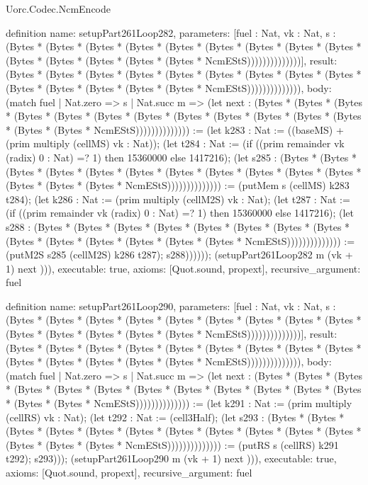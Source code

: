 \begin{lexlean}{Uorc.Codec.NcmEncode}
\begin{semanticmodule}
definition{
  name: setupPart261Loop282,
  parameters: [fuel : Nat, vk : Nat, s : (Bytes * (Bytes * (Bytes * (Bytes * (Bytes * (Bytes * (Bytes * (Bytes * (Bytes * (Bytes * (Bytes * (Bytes * (Bytes * (Bytes * NcmEStS))))))))))))))],
  result: (Bytes * (Bytes * (Bytes * (Bytes * (Bytes * (Bytes * (Bytes * (Bytes * (Bytes * (Bytes * (Bytes * (Bytes * (Bytes * (Bytes * NcmEStS)))))))))))))),
  body: (match fuel
    | Nat.zero => s
    | Nat.succ m => (let next : (Bytes * (Bytes * (Bytes * (Bytes * (Bytes * (Bytes * (Bytes * (Bytes * (Bytes * (Bytes * (Bytes * (Bytes * (Bytes * (Bytes * NcmEStS)))))))))))))) := (let k283 : Nat := ((baseMS) + (prim multiply (cellMS) vk : Nat)); (let t284 : Nat := (if ((prim remainder vk (radix) 0 : Nat) =? 1) then 15360000 else 1417216); (let s285 : (Bytes * (Bytes * (Bytes * (Bytes * (Bytes * (Bytes * (Bytes * (Bytes * (Bytes * (Bytes * (Bytes * (Bytes * (Bytes * (Bytes * NcmEStS)))))))))))))) := (putMem s (cellMS) k283 t284); (let k286 : Nat := (prim multiply (cellM2S) vk : Nat); (let t287 : Nat := (if ((prim remainder vk (radix) 0 : Nat) =? 1) then 15360000 else 1417216); (let s288 : (Bytes * (Bytes * (Bytes * (Bytes * (Bytes * (Bytes * (Bytes * (Bytes * (Bytes * (Bytes * (Bytes * (Bytes * (Bytes * (Bytes * NcmEStS)))))))))))))) := (putM2S s285 (cellM2S) k286 t287); s288)))))); (setupPart261Loop282 m (vk + 1) next ))),
  executable: true,
  axioms: [Quot.sound, propext],
  recursive_argument: fuel
}

definition{
  name: setupPart261Loop290,
  parameters: [fuel : Nat, vk : Nat, s : (Bytes * (Bytes * (Bytes * (Bytes * (Bytes * (Bytes * (Bytes * (Bytes * (Bytes * (Bytes * (Bytes * (Bytes * (Bytes * (Bytes * NcmEStS))))))))))))))],
  result: (Bytes * (Bytes * (Bytes * (Bytes * (Bytes * (Bytes * (Bytes * (Bytes * (Bytes * (Bytes * (Bytes * (Bytes * (Bytes * (Bytes * NcmEStS)))))))))))))),
  body: (match fuel
    | Nat.zero => s
    | Nat.succ m => (let next : (Bytes * (Bytes * (Bytes * (Bytes * (Bytes * (Bytes * (Bytes * (Bytes * (Bytes * (Bytes * (Bytes * (Bytes * (Bytes * (Bytes * NcmEStS)))))))))))))) := (let k291 : Nat := (prim multiply (cellRS) vk : Nat); (let t292 : Nat := (cell3Half); (let s293 : (Bytes * (Bytes * (Bytes * (Bytes * (Bytes * (Bytes * (Bytes * (Bytes * (Bytes * (Bytes * (Bytes * (Bytes * (Bytes * (Bytes * NcmEStS)))))))))))))) := (putRS s (cellRS) k291 t292); s293))); (setupPart261Loop290 m (vk + 1) next ))),
  executable: true,
  axioms: [Quot.sound, propext],
  recursive_argument: fuel
}


\end{semanticmodule}
\end{lexlean}
